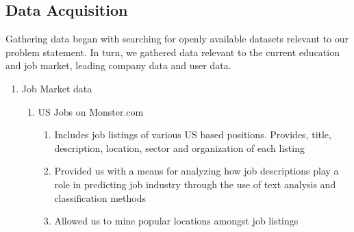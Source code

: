 \subsection{Data Acquisition}
Gathering data began with searching for openly available datasets relevant to our problem statement. In turn, we gathered data relevant to the current education and job market, leading company data and user data. 
\begin{enumerate}
	\item Job Market data
	\begin{enumerate}
		\item US Jobs on Monster.com \cite{kaggleMonsterJobs}
		\begin{enumerate}
			\item Includes job listings of various US based positions. Provides, title, description, location, sector and organization of each listing 
			\item Provided us with a means for analyzing how job descriptions play a role in predicting job industry through the use of text analysis and classification methods
			\item Allowed us to mine popular locations amongst job listings 
		\end{enumerate}
	\end{enumerate}


\end{enumerate}

